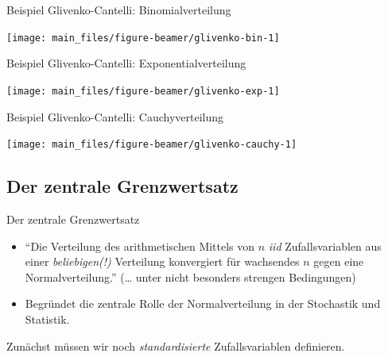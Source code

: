 \documentclass[
  10pt,
  ignorenonframetext,
]{beamer}
\begin{document}
\begin{frame}{Beispiel Glivenko-Cantelli: Binomialverteilung}
\label{beispiel-glivenko-cantelli-binomialverteilung}
\scriptsize

\begin{center}\texttt{[image: main\_files/figure-beamer/glivenko-bin-1]} \end{center}

\normalsize
\end{frame}

\begin{frame}{Beispiel Glivenko-Cantelli: Exponentialverteilung}
\label{beispiel-glivenko-cantelli-exponentialverteilung}
\scriptsize

\begin{center}\texttt{[image: main\_files/figure-beamer/glivenko-exp-1]} \end{center}

\normalsize
\end{frame}

\begin{frame}{Beispiel Glivenko-Cantelli: Cauchyverteilung}
\label{beispiel-glivenko-cantelli-cauchyverteilung}
\scriptsize

\begin{center}\texttt{[image: main\_files/figure-beamer/glivenko-cauchy-1]} \end{center}

\normalsize
\end{frame}

\subsection{Der zentrale
Grenzwertsatz}\label{der-zentrale-grenzwertsatz}

\begin{frame}{Der zentrale Grenzwertsatz}
\label{der-zentrale-grenzwertsatz-1}
\begin{itemize}
\item
  ``Die Verteilung des arithmetischen Mittels von \(n\) \emph{iid}
  Zufallsvariablen aus einer \emph{beliebigen(!)} Verteilung konvergiert
  für wachsendes \(n\) gegen eine Normalverteilung.'' (\ldots{} unter
  nicht besonders strengen Bedingungen)
\item
  Begründet die zentrale Rolle der Normalverteilung in der Stochastik
  und Statistik.
\end{itemize}

Zunächst müssen wir noch \emph{standardisierte} Zufallsvariablen
definieren.
\end{frame}
\end{document}
